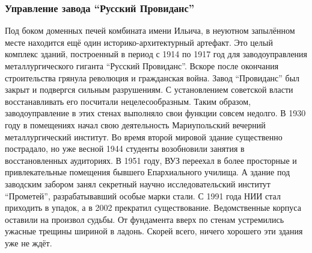  
 
 
 
 

\subsubsection{Управление завода \enquote{Русский Провиданс}}

Под боком доменных печей комбината имени Ильича, в неуютном запылённом месте
находится ещё один историко-архитектурный артефакт. Это целый комплекс зданий,
построенный в период с 1914 по 1917 год для заводоуправления металлургического
гиганта \enquote{Русский Провиданс}. Вскоре после окончания строительства грянула
революция и гражданская война. Завод \enquote{Провиданс} был закрыт и подвергся сильным
разрушениям. С установлением советской власти восстанавливать его посчитали
нецелесообразным. Таким образом, заводоуправление в этих стенах выполняло свои
функции совсем недолго. В 1930 году в помещениях начал свою деятельность
Мариупольский вечерний металлургический институт. Во время второй мировой
здание существенно пострадало, но уже весной 1944 студенты возобновили занятия
в восстановленных аудиториях. В 1951 году, ВУЗ переехал в более просторные и
привлекательные помещения бывшего Епархиального училища. А здание под заводским
забором занял секретный научно исследовательский институт \enquote{Прометей},
разрабатывавший особые марки стали. С 1991 года НИИ стал приходить в упадок, а
в 2002 прекратил существование. Ведомственные корпуса оставили на произвол
судьбы. От фундамента вверх по стенам устремились ужасные трещины шириной в
ладонь. Скорей всего, ничего хорошего эти здания уже не ждёт.


